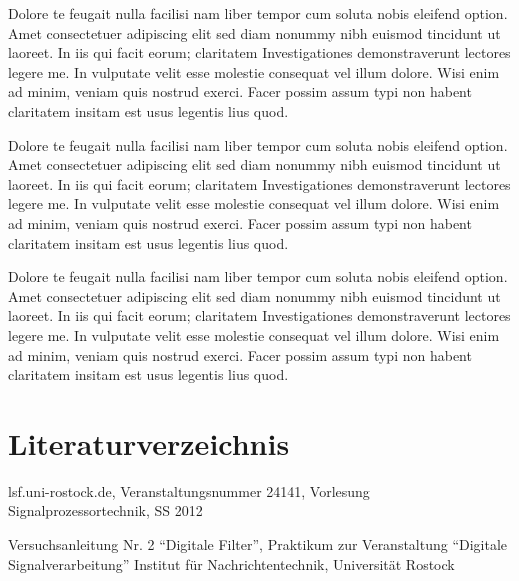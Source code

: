\documentclass[a4paper,12pt,fontsize=12,DIV=12]{scrartcl}
\begin{document}
Dolore te feugait nulla facilisi nam liber tempor cum soluta nobis eleifend option. Amet consectetuer adipiscing elit sed diam nonummy nibh euismod tincidunt ut laoreet. In iis qui facit eorum; claritatem Investigationes demonstraverunt lectores legere me. In vulputate velit esse molestie consequat vel illum dolore. Wisi enim ad minim, veniam quis nostrud exerci. Facer possim assum typi non habent claritatem insitam est usus legentis lius quod.

Dolore te feugait nulla facilisi nam liber tempor cum soluta nobis eleifend option. Amet consectetuer adipiscing elit sed diam nonummy nibh euismod tincidunt ut laoreet. In iis qui facit eorum; claritatem Investigationes demonstraverunt lectores legere me. In vulputate velit esse molestie consequat vel illum dolore. Wisi enim ad minim, veniam quis nostrud exerci. Facer possim assum typi non habent claritatem insitam est usus legentis lius quod.

Dolore te feugait nulla facilisi nam liber tempor cum soluta nobis eleifend option. Amet consectetuer adipiscing elit sed diam nonummy nibh euismod tincidunt ut laoreet. In iis qui facit eorum; claritatem Investigationes demonstraverunt lectores legere me. In vulputate velit esse molestie consequat vel illum dolore. Wisi enim ad minim, veniam quis nostrud exerci. Facer possim assum typi non habent claritatem insitam est usus legentis lius quod.

\clearpage

\section{Literaturverzeichnis}

lsf.uni-rostock.de, Veranstaltungsnummer 24141, Vorlesung Signalprozessortechnik, SS 2012
\newline

Versuchsanleitung Nr. 2 "`Digitale Filter"', Praktikum zur Veranstaltung "`Digitale Signalverarbeitung"' Institut für Nachrichtentechnik, Universität Rostock
\end{document}
